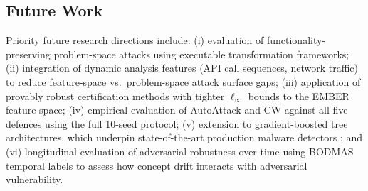 \documentclass[conference]{IEEEtran}
\begin{document}
\subsection{Future Work}

Priority future research directions include: (i) evaluation of functionality-preserving problem-space attacks \cite{pierazzi2020} using executable transformation frameworks; (ii) integration of dynamic analysis features (API call sequences, network traffic) to reduce feature-space vs.\ problem-space attack surface gaps; (iii) application of provably robust certification methods \cite{wongkolter2018} with tighter $\ell_\infty$ bounds to the EMBER feature space; (iv) empirical evaluation of AutoAttack \cite{croce2020} and CW \cite{carlini2017} against all five defences using the full 10-seed protocol; (v) extension to gradient-boosted tree architectures, which underpin state-of-the-art production malware detectors \cite{anderson2018}; and (vi) longitudinal evaluation of adversarial robustness over time using BODMAS temporal labels to assess how concept drift interacts with adversarial vulnerability.



\end{document}
